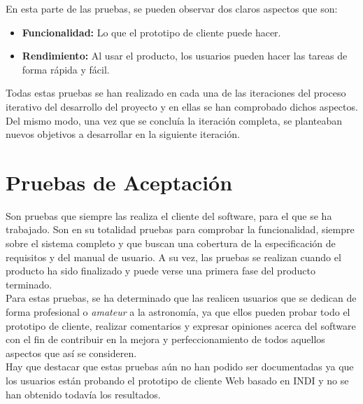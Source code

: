 En esta parte de las pruebas, se pueden observar dos claros aspectos que son:
\begin{itemize}
  \item \textbf{Funcionalidad:} Lo que el prototipo de cliente puede hacer.
  \item \textbf{Rendimiento:} Al usar el producto, los usuarios pueden hacer las tareas de forma rápida y fácil.
\end{itemize}
Todas estas pruebas se han realizado en cada una de las iteraciones del proceso iterativo del desarrollo del proyecto y en ellas se han comprobado dichos aspectos. Del mismo modo, una vez que se concluía  la iteración completa, se planteaban nuevos objetivos a desarrollar en la siguiente iteración.

\section{Pruebas de Aceptación}
Son pruebas que siempre las realiza el cliente del software, para el que se ha trabajado.
Son en su totalidad pruebas para comprobar la funcionalidad, siempre sobre el sistema completo y que buscan una cobertura de la especificación de requisitos y del manual de usuario. A su vez, las pruebas se realizan cuando el producto ha sido finalizado y puede verse una primera fase del producto terminado.\\

Para estas pruebas, se ha determinado que las realicen usuarios que se dedican de forma profesional o \textit{amateur} a la astronomía, ya que ellos pueden probar todo el prototipo de cliente, realizar comentarios y expresar opiniones acerca del software con el fin de contribuir en la mejora y perfeccionamiento de todos aquellos aspectos que así se consideren. \\

Hay que destacar que estas pruebas aún no han podido ser documentadas ya que los usuarios están probando el prototipo de cliente Web basado en INDI y no se han obtenido todavía los resultados.
